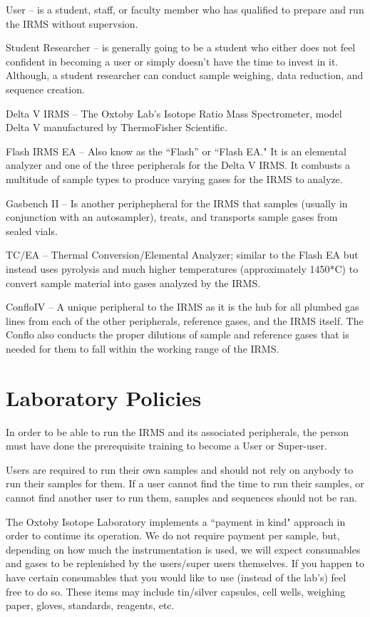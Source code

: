 \documentclass[12pt]{../SOP3_beta}\usepackage[]{graphicx}\usepackage[]{color}
\begin{document}
\NP User -- is a student, staff, or faculty member who has qualified to prepare and run the IRMS without supervsion.

\NP Student Researcher -- is generally going to be a student who either does not feel confident in becoming a user or simply doesn't have the time to invest in it. Although, a student researcher can conduct sample weighing, data reduction, and sequence creation.

\NP Delta V IRMS -- The Oxtoby Lab's Isotope Ratio Mass Spectrometer, model Delta V manufactured by ThermoFisher Scientific. 

\NP Flash IRMS EA -- Also know as the ``Flash'' or ``Flash EA." It is an elemental analyzer and one of the three peripherals for the Delta V IRMS. It combusts a multitude of sample types to produce varying gases for the IRMS to analyze. 

\NP Gasbench II -- Is another periphepheral for the IRMS that samples (usually in conjunction with an autosampler), treats, and transports sample gases from sealed vials.

\NP TC/EA -- Thermal Conversion/Elemental Analyzer; similar to the Flash EA but instead uses pyrolysis and much higher temperatures (approximately 1450*C) to convert sample material into gases analyzed by the IRMS.

\NP ConfloIV -- A unique peripheral to the IRMS as it is the hub for all plumbed gas lines from each of the other peripherals, reference gases, and the IRMS itself. The Conflo also conducts the proper dilutions of sample and reference gases that is needed for them to fall within the working range of the IRMS.

\section{Laboratory Policies}

\NP In order to be able to run the IRMS and its associated peripherals, the person must have done the prerequisite training to become a User or Super-user. 

\NP Users are required to run their own samples and should not rely on anybody to run their samples for them. If a user cannot find the time to run their samples, or cannot find another user to run them, samples and sequences should not be ran.

\NP The Oxtoby Isotope Laboratory implements a ``payment in kind" approach in order to continue its operation. We do not require payment per sample, but, depending on how much the instrumentation is used, we will expect consumables and gases to be replenished by the users/super users themselves. If you happen to have certain consumables that you would like to use (instead of the lab's) feel free to do so. These items may include tin/silver capsules, cell wells, weighing paper, gloves, standards, reagents, etc.
\end{document}

